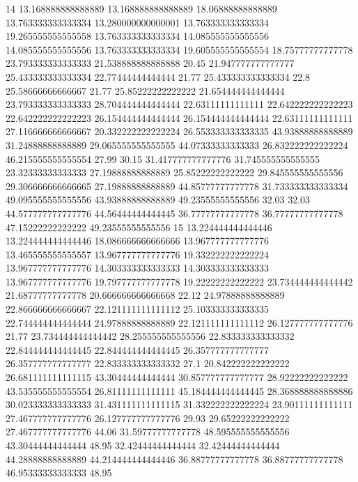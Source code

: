 14 13.168888888888889 13.168888888888889 18.06888888888889 13.763333333333334 13.280000000000001 13.763333333333334 19.265555555555558 13.763333333333334 14.085555555555556 14.085555555555556 13.763333333333334 19.605555555555554 18.75777777777778 23.793333333333333 21.538888888888888 20.45 21.947777777777777 25.433333333333334 22.77444444444444 21.77 25.433333333333334 22.8 25.58666666666667 21.77 25.85222222222222 21.654444444444444 23.793333333333333 28.704444444444444 22.63111111111111 22.642222222222223 22.642222222222223 26.154444444444444 26.154444444444444 22.63111111111111 27.116666666666667 20.332222222222224 26.553333333333335 43.93888888888889 31.24888888888889 29.065555555555555 44.07333333333333 26.832222222222224 46.215555555555554 27.99 30.15 31.417777777777776 31.745555555555555 23.32333333333333 27.19888888888889 25.85222222222222 29.845555555555556 29.306666666666665 27.19888888888889 44.85777777777778 31.733333333333334 49.095555555555556 43.93888888888889 49.23555555555556 32.03 32.03 44.577777777777776 44.56444444444445 36.77777777777778 36.77777777777778 47.15222222222222 49.23555555555556
15 13.224444444444446 13.224444444444446 18.086666666666666 13.967777777777776 13.465555555555557 13.967777777777776 19.332222222222224 13.967777777777776 14.303333333333333 14.303333333333333 13.967777777777776 19.797777777777778 19.22222222222222 23.734444444444442 21.68777777777778 20.666666666666668 22.12 24.97888888888889 22.866666666666667 22.121111111111112 25.103333333333335 22.744444444444444 24.97888888888889 22.121111111111112 26.127777777777776 21.77 23.734444444444442 28.255555555555556 22.833333333333332 22.844444444444445 22.844444444444445 26.357777777777777 26.357777777777777 22.833333333333332 27.1 20.842222222222222 26.681111111111115 43.30444444444444 30.857777777777777 28.92222222222222 43.535555555555554 26.81111111111111 45.184444444444445 28.368888888888886 30.023333333333333 31.431111111111115 31.332222222222224 23.90111111111111 27.467777777777776 26.127777777777776 29.93 29.65222222222222 27.467777777777776 44.06 31.59777777777778 48.595555555555556 43.30444444444444 48.95 32.42444444444444 32.42444444444444 44.28888888888889 44.214444444444446 36.88777777777778 36.88777777777778 46.95333333333333 48.95
